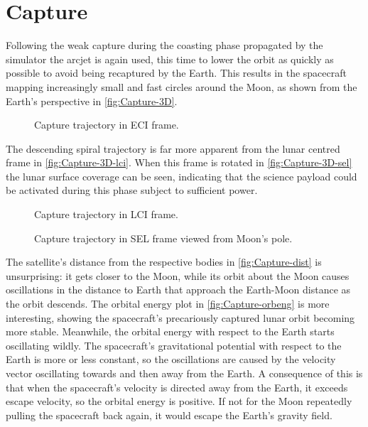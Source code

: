 \section{Capture} \label{sec:Capture}

Following the weak capture during the coasting phase propagated by the simulator the arcjet is again used, this time to lower the orbit as quickly as possible to avoid being recaptured by the Earth. This results in the spacecraft mapping increasingly small and fast circles around the Moon, as shown from the Earth's perspective in \autoref{fig:Capture-3D}.

\begin{figure}
\centering
\def\svgwidth{\figurewidth}

\caption{Capture trajectory in ECI frame.}
\label{fig:Capture-3D}
\end{figure}

The descending spiral trajectory is far more apparent from the lunar centred frame in \autoref{fig:Capture-3D-lci}. When this frame is rotated in \autoref{fig:Capture-3D-sel} the lunar surface coverage can be seen, indicating that the science payload could be activated during this phase subject to sufficient power.

\begin{figure}
\centering
\def\svgwidth{\figurewidth}

\caption{Capture trajectory in LCI frame.}
\label{fig:Capture-3D-lci}
\end{figure}

\begin{figure}
\centering
\def\svgwidth{\figurewidth}

\caption{Capture trajectory in SEL frame viewed from Moon's pole.}
\label{fig:Capture-3D-sel}
\end{figure}

%

The satellite's distance from the respective bodies in \autoref{fig:Capture-dist} is unsurprising: it gets closer to the Moon, while its orbit about the Moon causes oscillations in the distance to Earth that approach the Earth-Moon distance as the orbit descends. The orbital energy plot in \autoref{fig:Capture-orbeng} is more interesting, showing the spacecraft's precariously captured lunar orbit becoming more stable. Meanwhile, the orbital energy with respect to the Earth starts oscillating wildly. The spacecraft's gravitational potential with respect to the Earth is more or less constant, so the oscillations are caused by the velocity vector oscillating towards and then away from the Earth. A consequence of this is that when the spacecraft's velocity is directed away from the Earth, it exceeds escape velocity, so the orbital energy is positive. If not for the Moon repeatedly pulling the spacecraft back again, it would escape the Earth's gravity field.

